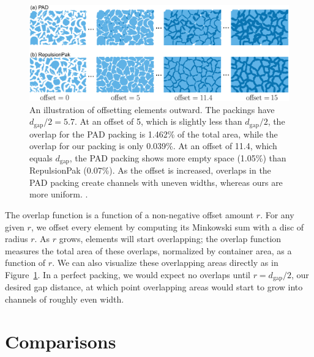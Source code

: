 \begin{figure}
\centering
\includegraphics[width=1.0\textwidth]{figures/metrics/overlap_metric.pdf}
\caption[An illustration of offsetting elements outward]
{\label{fig_overlap_function}
    An illustration of offsetting elements outward. The packings have $d_\mathrm{gap} / 2 = 5.7$.  
    At an offset of 5, which is slightly less than $d_\mathrm{gap} / 2$,
    the overlap for the PAD packing is 1.462\% of the total area, while the overlap for our packing is only 0.039\%.
    At an offset of 11.4, which equals $d_\mathrm{gap}$, the PAD packing shows more empty space (1.05\%) than RepulsionPak (0.07\%).
    As the offset is increased, overlaps in the PAD packing create channels
  with uneven widths, whereas ours are more uniform.
  .
  }
\end{figure}

The overlap function is a function of a non-negative offset amount
$r$.  For any given $r$, we offset every element by computing its Minkowski
sum with a disc of radius $r$.  As $r$ grows, elements will start overlapping;
the overlap function measures the total area of these overlaps, normalized
by container area, as a function of $r$.  We can also visualize these 
overlapping areas directly as in Figure~\ref{fig_overlap_function}.  In a 
perfect packing, we would expect no overlaps until $r=d_\mathrm{gap}/2$,
our desired gap distance, at which point overlapping areas would start to
grow into channels of roughly even width.



\section{Comparisons}
\label{metric_comparison}

